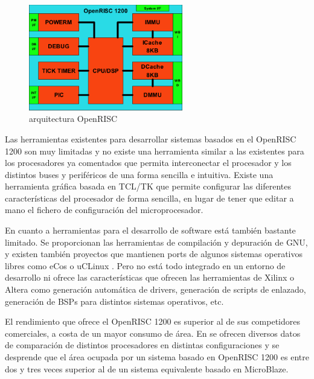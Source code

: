 \begin{figure}[h!]
 	\begin{center}
  	\includegraphics[width=0.6\textwidth,keepaspectratio=true]{./images/OR1200}
  	\caption{arquitectura OpenRISC}
 	\end{center}
	\end{figure}


Las herramientas existentes para desarrollar sistemas basados en el OpenRISC 1200 son muy limitadas y no existe una herramienta similar a las existentes para los procesadores ya comentados que permita interconectar el procesador y los distintos buses y periféricos de una forma sencilla e intuitiva. Existe una herramienta gráfica basada en TCL/TK que permite configurar las diferentes características del procesador de forma sencilla\cite{Etiqueta29}, en lugar de tener que editar a mano el fichero de configuración del microprocesador.

En cuanto a herramientas para el desarrollo de software está también bastante limitado. Se proporcionan las herramientas de compilación y depuración de GNU, y existen también proyectos que mantienen ports de algunos sistemas operativos libres como eCos\cite{Etiqueta30} o uCLinux \cite{Etiqueta31}. Pero no está todo integrado en un entorno de desarrollo ni ofrece las características que ofrecen las herramientas de Xilinx o Altera como generación automática de drivers, generación de scripts de enlazado, generación de BSPs para distintos sistemas operativos, etc.

El rendimiento que ofrece el OpenRISC 1200 es superior al de sus competidores comerciales, a costa de un mayor consumo de área. En \cite{Etiqueta32} se ofrecen diversos datos de comparación de distintos procesadores en distintas configuraciones y se desprende que el área ocupada por un sistema basado en OpenRISC 1200 es entre dos y tres veces superior al de un sistema equivalente basado en MicroBlaze.

